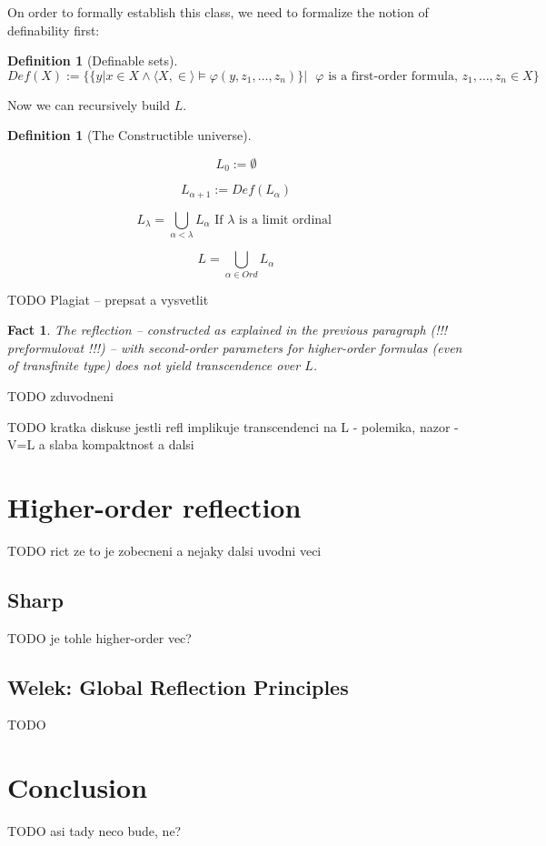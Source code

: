 \documentclass[12pt,a4paper]{article}
\newtheorem{definition}[theorem]{Definition}
\newtheorem{Fact}[theorem]{Fact}
\newcommand{\bce}{\begin{compactenum}}
\newcommand{\ece}{\end{compactenum}}
\begin{document}
On order to formally establish this class, we need to formalize the notion of definability first:

\begin{definition}[Definable sets]
\begin{equation}
Def(X) := \{\{{y | x }\in X \land \langle X, \in \rangle \models \varphi(y, z_1,\ldots,z_n) \} |\mbox{ }\varphi\mbox{ is a first-order formula, }z_1,\ldots,z_n \in X \}
\end{equation}
\end{definition}

Now we can recursively build $L$.
\begin{definition}[The Constructible universe\newline]
\bce[(i)]
\item
\begin{equation}
L_0 := \emptyset
\end{equation}

\item
\begin{equation}
L_{\alpha+1} := Def(L_{\alpha})
\end{equation}
\item
\begin{equation}
L_{\lambda} = \bigcup_{\alpha < \lambda} L_{\alpha}\mbox{ If }\lambda\mbox{ is a limit ordinal }
\end{equation}
\item
\begin{equation}
L = \bigcup_{\alpha\in Ord} L_{\alpha}
\end{equation}
\ece
\end{definition}

TODO Plagiat -- prepsat a vysvetlit
\begin{Fact}
The reflection -- constructed as explained in the previous paragraph (!!! preformulovat !!!) -- with second-order parameters for higher-order formulas (even of transfinite type) does not yield transcendence over $L$.
\end{Fact}


TODO zduvodneni

TODO kratka diskuse jestli refl implikuje transcendenci na L - polemika, nazor - V=L a slaba kompaktnost a dalsi
\newpage
\section{Higher-order reflection} %
TODO rict ze to je zobecneni a nejaky dalsi uvodni veci

\subsection{Sharp}
TODO je tohle higher-order vec?

\subsection{Welek: Global Reflection Principles}
TODO

\section{Conclusion}
TODO asi tady neco bude, ne?

\newpage


\end{document}
